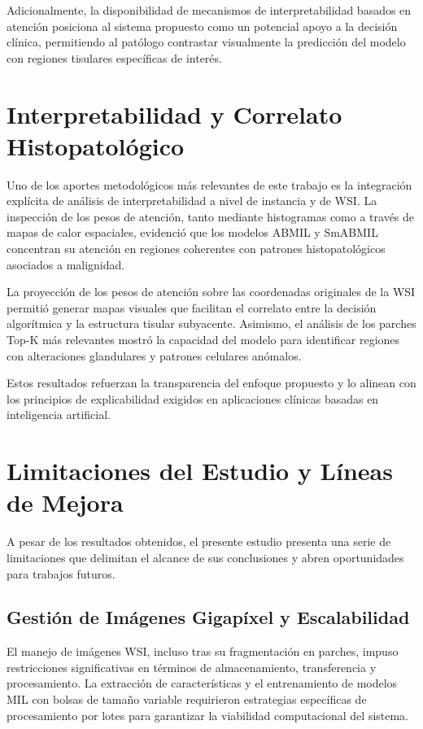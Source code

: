 Adicionalmente, la disponibilidad de mecanismos de interpretabilidad basados en atención posiciona al sistema propuesto como un potencial apoyo a la decisión clínica, permitiendo al patólogo contrastar visualmente la predicción del modelo con regiones tisulares específicas de interés.

\section{Interpretabilidad y Correlato Histopatológico}
Uno de los aportes metodológicos más relevantes de este trabajo es la integración explícita de análisis de interpretabilidad a nivel de instancia y de WSI. La inspección de los pesos de atención, tanto mediante histogramas como a través de mapas de calor espaciales, evidenció que los modelos ABMIL y SmABMIL concentran su atención en regiones coherentes con patrones histopatológicos asociados a malignidad.\newline

La proyección de los pesos de atención sobre las coordenadas originales de la WSI permitió generar mapas visuales que facilitan el correlato entre la decisión algorítmica y la estructura tisular subyacente. Asimismo, el análisis de los parches Top-K más relevantes mostró la capacidad del modelo para identificar regiones con alteraciones glandulares y patrones celulares anómalos.\newline

Estos resultados refuerzan la transparencia del enfoque propuesto y lo alinean con los principios de explicabilidad exigidos en aplicaciones clínicas basadas en inteligencia artificial.

\section{Limitaciones del Estudio y Líneas de Mejora}
A pesar de los resultados obtenidos, el presente estudio presenta una serie de limitaciones que delimitan el alcance de sus conclusiones y abren oportunidades para trabajos futuros.

\subsection{Gestión de Imágenes Gigapíxel y Escalabilidad}
El manejo de imágenes WSI, incluso tras su fragmentación en parches, impuso restricciones significativas en términos de almacenamiento, transferencia y procesamiento. La extracción de características y el entrenamiento de modelos MIL con bolsas de tamaño variable requirieron estrategias específicas de procesamiento por lotes para garantizar la viabilidad computacional del sistema.

